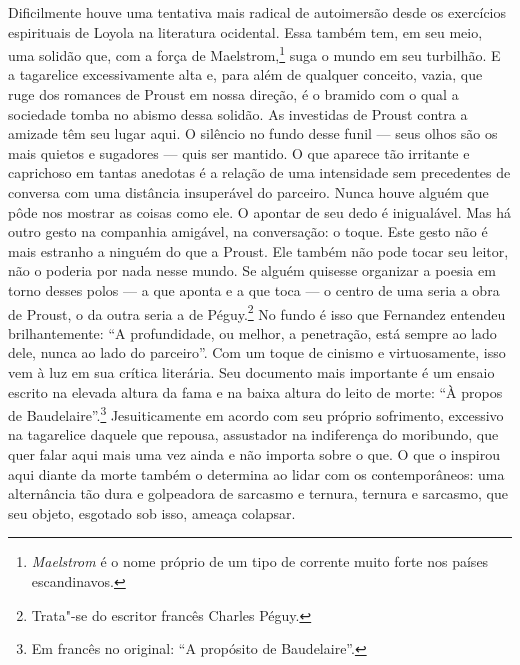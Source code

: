Dificilmente houve uma tentativa mais radical de autoimersão desde os
exercícios espirituais de Loyola na literatura ocidental. Essa também
tem, em seu meio, uma solidão que, com a força de Maelstrom,\footnote{\emph{Maelstrom} é o nome próprio de um tipo de corrente muito forte
  nos países escandinavos. \versal{[N. T.]}} suga o mundo em seu turbilhão. E a
tagarelice excessivamente alta e, para além de qualquer conceito, vazia,
que ruge dos romances de Proust em nossa direção, é o bramido com o qual
a sociedade tomba no abismo dessa solidão. As investidas de Proust
contra a amizade têm seu lugar aqui. O silêncio no fundo desse funil ---
seus olhos são os mais quietos e sugadores --- quis ser mantido. O que
aparece tão irritante e caprichoso em tantas anedotas é a relação de uma
intensidade sem precedentes de conversa com uma distância insuperável do
parceiro. Nunca houve alguém que pôde nos mostrar as coisas como ele. O
apontar de seu dedo é inigualável. Mas há outro gesto na companhia
amigável, na conversação: o toque. Este gesto não é mais estranho a
ninguém do que a Proust. Ele também não pode tocar seu leitor, não o
poderia por nada nesse mundo. Se alguém quisesse organizar a poesia em
torno desses polos --- a que aponta e a que toca --- o centro de uma seria
a obra de Proust, o da outra seria a de Péguy.\footnote{Trata"-se do
  escritor francês Charles Péguy. \versal{[N. E.]}} No fundo é isso que Fernandez
entendeu brilhantemente: ``A profundidade, ou melhor, a penetração, está
sempre ao lado dele, nunca ao lado do parceiro''. Com um toque de
cinismo e virtuosamente, isso vem à luz em sua crítica literária. Seu
documento mais importante é um ensaio escrito na elevada altura da fama e
na baixa altura do leito de morte: ``À propos de Baudelaire''.\footnote{Em francês no  original: ``A propósito de Baudelaire''. \versal{[N. T.]}} Jesuiticamente em acordo com seu próprio %
sofrimento, excessivo na tagarelice daquele que repousa, assustador na
indiferença do moribundo, que quer falar aqui mais uma vez ainda e não
importa sobre o que. O que o inspirou aqui diante da morte também o
determina ao lidar com os contemporâneos: uma alternância tão dura e
golpeadora de sarcasmo e ternura, ternura e sarcasmo, que seu objeto,
esgotado sob isso, ameaça colapsar.

